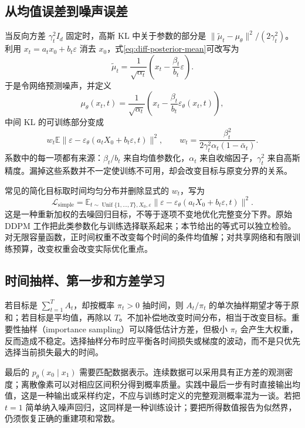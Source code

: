 \documentclass[UTF8,12pt,a4paper,fontset=fandol]{ctexart}
\begin{document}
\subsection{从均值误差到噪声误差}
当反向方差 $\gamma_t^2I_d$ 固定时，高斯 KL 中关于参数的部分是 $\|\widetilde\mu_t-\mu_\theta\|^2/(2\gamma_t^2)$。利用 $x_t=a_tx_0+b_t\varepsilon$ 消去 $x_0$，式\eqref{eq:diff-posterior-mean}可改写为
\[
 \widetilde\mu_t=\frac1{\sqrt{\alpha_t}}\left(x_t-\frac{\beta_t}{b_t}\varepsilon\right).
\]
于是令网络预测噪声，并定义
\begin{equation}
 \mu_\theta(x_t,t)=\frac1{\sqrt{\alpha_t}}\left(x_t-\frac{\beta_t}{b_t}\varepsilon_\theta(x_t,t)\right),
 \label{eq:diff-eps-mean}
\end{equation}
中间 KL 的可训练部分变成
\begin{equation}
 w_t\mathbb E\|\varepsilon-\varepsilon_\theta(a_tX_0+b_t\varepsilon,t)\|^2,
 \qquad w_t=\frac{\beta_t^2}{2\gamma_t^2\alpha_t(1-\bar\alpha_t)}.
 \label{eq:diff-vlb-weight}
\end{equation}
系数中的每一项都有来源：$\beta_t/b_t$ 来自均值参数化，$\alpha_t$ 来自收缩因子，$\gamma_t^2$ 来自高斯精度。漏掉这些系数并不一定使训练不可用，却会改变目标与原变分界的关系。

常见的简化目标取时间均匀分布并删除显式的 $w_t$，写为
\begin{equation}
 \mathcal L_{\mathrm{simple}}=
 \mathbb E_{t\sim\operatorname{Unif}\{1,\ldots,T\},X_0,\varepsilon}
 \|\varepsilon-\varepsilon_\theta(a_tX_0+b_t\varepsilon,t)\|^2.
 \label{eq:diff-simple}
\end{equation}
这是一种重新加权的去噪回归目标，不等于逐项不变地优化完整变分下界。原始 DDPM 工作把此类参数化与训练选择联系起来\cite{ho2020}；本节给出的等式可以独立检验。对无限容量函数，正时间权重不改变每个时间的条件均值解；对共享网络和有限训练预算，改变权重会改变实际优化重点。

\subsection{时间抽样、第一步和方差学习}
若目标是 $\sum_{t=1}^{T}A_t$，却按概率 $\pi_t>0$ 抽时间，则 $A_t/\pi_t$ 的单次抽样期望才等于原和；若目标是平均值，再除以 $T$。不加补偿地改变时间分布，相当于改变目标。重要性抽样（importance sampling）可以降低估计方差，但极小 $\pi_t$ 会产生大权重，反而造成不稳定。选择抽样分布时应平衡各时间损失或梯度的波动，而不是只优先选择当前损失最大的时间。

最后的 $p_\theta(x_0\mid x_1)$ 需要匹配数据表示。连续数据可以采用具有正方差的观测密度；离散像素可以对相应区间积分得到概率质量。实践中最后一步有时直接输出均值，这是一种输出或采样约定，不应与训练时定义的完整观测概率混为一谈。若把 $t=1$ 简单纳入噪声回归，这同样是一种训练设计；要把所得数值报告为似然界，仍须恢复正确的重建项和常数。
\end{document}

